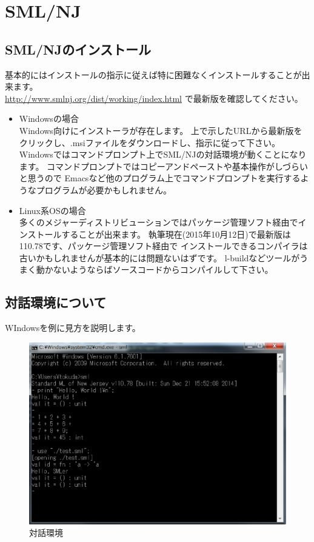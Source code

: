\documentclass[11pt,a4paper]{jarticle}
\begin{document}
\section{SML/NJ}
\subsection{SML/NJのインストール}
基本的にはインストールの指示に従えば特に困難なくインストールすることが出来ます。\\
\url{http://www.smlnj.org/dist/working/index.html} で最新版を確認してください。
\begin{itemize}
\item Windowsの場合\\
  Windows向けにインストーラが存在します。
  上で示したURLから最新版をクリックし、.msiファイルをダウンロードし、指示に従って下さい。\\
  Windowsではコマンドプロンプト上でSML/NJの対話環境が動くことになります。
  コマンドプロンプトではコピーアンドペーストや基本操作がしづらいと思うので
  Emacsなど他のプログラム上でコマンドプロンプトを実行するようなプログラムが必要かもしれません。
\item Linux系OSの場合\\
  多くのメジャーディストリビューションではパッケージ管理ソフト経由でインストールすることが出来ます。
  執筆現在(2015年10月12日)で最新版は110.78です、パッケージ管理ソフト経由で
  インストールできるコンパイラは古いかもしれませんが基本的には問題ないはずです。
  l-buildなどツールがうまく動かないようならばソースコードからコンパイルして下さい。
\end{itemize}
\subsection{対話環境について}
WIndowsを例に見方を説明します。

\begin{figure}[htbp]
  \centering
  \includegraphics[scale=0.8]{./interactive.eps}
  \caption{対話環境}
  \label{fig:hello}
\end{figure}
\end{document}
